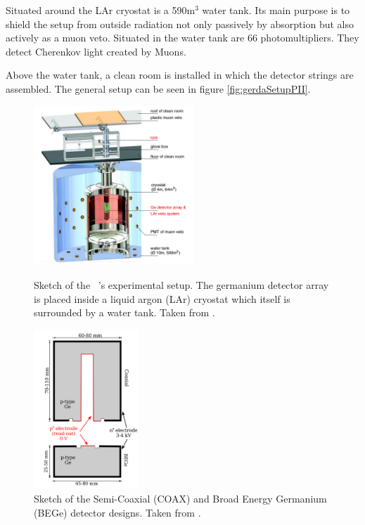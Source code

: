 \documentclass[encoding=utf8,british]{tumphthesis}
\begin{document}
Situated around the LAr cryostat is a 590m$^3$ water tank.
Its main purpose is to shield the setup from outside radiation not only passively by absorption but also actively as a muon veto.
Situated in the water tank are 66 photomultipliers.
They detect Cherenkov light created by Muons.

Above the water tank, a clean room is installed in which the detector strings are assembled.  
The general setup can be seen in figure \ref{fig:gerdaSetupPII}.
\\

\begin{figure}[t!]
	\centering
	\begin{minipage}[t!]{.45\textwidth}
		\centering
		\includegraphics[height=60mm]{./Bilder/GERDAsetupPhaseII.png}
		\caption{Sketch of the \gerda\ \PII's experimental setup. The germanium detector array is placed inside a liquid argon (LAr) cryostat which itself is surrounded by a water tank. Taken from \cite{collaboration_upgrade_2018}.}
		\label{fig:gerdaSetupPII}
	\end{minipage}\hfill%
	\begin{minipage}[t!]{.45\textwidth}
		\centering
		\includegraphics[height=60mm]{./Bilder/DetectorDesign.png}
		\caption{Sketch of the Semi-Coaxial (COAX) and Broad Energy Germanium (BEGe) detector designs. Taken from \cite{agostini_background_2014}.}
		\label{fig:DetcDes}
	\end{minipage}
\end{figure}
\end{document}
